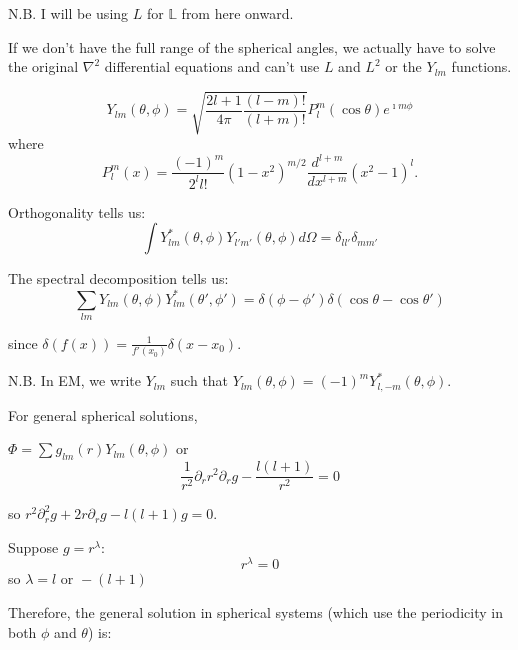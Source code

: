 \documentclass[a4paper,twoside,master.tex]{subfiles}
\begin{document}

\begin{note}{N.B.}
I will be using $L$ for $\mathbb{L}$ from here onward.
\end{note}

If we don't have the full range of the spherical angles, we actually have to solve the original $\nabla^2$ differential equations and can't use $L$ and $L^2$ or the $Y_{lm}$ functions.

\begin{equation}
    Y_{lm}(\theta,\phi) = \sqrt{\frac{2l+1}{4\pi}\frac{(l-m)!}{(l+m)!}}P_l^m(\cos\theta)e^{\imath m\phi}
\end{equation}
where
\begin{equation}
    P_l^m(x) = \frac{(-1)^m}{2^l l!}(1-x^2)^{m/2}\frac{d^{l+m}}{dx^{l+m}}(x^2-1)^l.
\end{equation}

Orthogonality tells us:
\begin{equation}
    \int Y_{lm}^*(\theta,\phi)Y_{l'm'}(\theta,\phi)d\Omega = \delta_{ll'}\delta_{mm'}
\end{equation}

The spectral decomposition tells us:
\begin{equation}
    \sum_{lm} Y_{lm}(\theta,\phi)Y_{lm}^*(\theta',\phi') = \delta(\phi-\phi')\delta(\cos\theta-\cos\theta')
\end{equation}

since $\delta(f(x)) = \frac{1}{f'(x_0)}\delta(x-x_0)$.

\begin{note}{N.B.}
In EM, we write $Y_{lm}$ such that
$Y_{lm}(\theta,\phi) = (-1)^m Y_{l,-m}^*(\theta,\phi)$.
\end{note}

For general spherical solutions,

$\Phi = \sum g_{lm}(r)Y_{lm}(\theta,\phi)$ or
\begin{equation}
    \frac{1}{r^2}\partial_r r^2\partial_r g - \frac{l(l+1)}{r^2} = 0
\end{equation}

so $r^2\partial_r^2 g + 2r\partial_r g - l(l+1)g = 0$.

Suppose $g = r^\lambda$:
\begin{equation}
    [\lambda(\lambda-1)+2\lambda - l(l+1)]r^\lambda = 0
\end{equation}
so $\lambda = l\text{ or } -(l+1)$

Therefore, the general solution in spherical systems (which use the periodicity in both $\phi$ and $\theta$) is:
\end{document}
